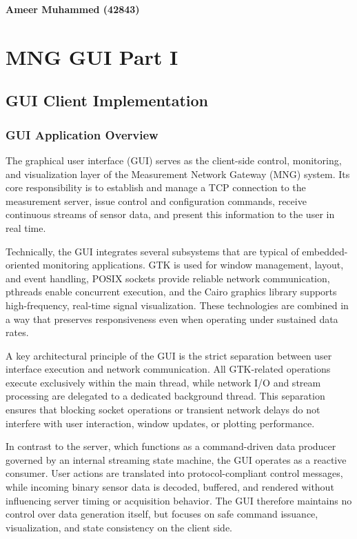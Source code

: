 

\newpage
\null 
\vfill
\begin{center}
\textbf{\large Ameer Muhammed (42843)}
\end{center}
\vfill
{}
\clearpage	

\chapter{MNG GUI Part I}
\section{GUI Client Implementation}
\subsection{GUI Application Overview}
The graphical user interface (GUI) serves as the client-side control, monitoring, and visualization layer of the Measurement Network Gateway (MNG) system. Its core responsibility is to establish and manage a TCP connection to the measurement server, issue control and configuration commands, receive continuous streams of sensor data, and present this information to the user in real time.

Technically, the GUI integrates several subsystems that are typical of embedded-oriented monitoring applications. GTK is used for window management, layout, and event handling, POSIX sockets provide reliable network communication, pthreads enable concurrent execution, and the Cairo graphics library supports high-frequency, real-time signal visualization. These technologies are combined in a way that preserves responsiveness even when operating under sustained data rates.

A key architectural principle of the GUI is the strict separation between user interface execution and network communication. All GTK-related operations execute exclusively within the main thread, while network I/O and stream processing are delegated to a dedicated background thread. This separation ensures that blocking socket operations or transient network delays do not interfere with user interaction, window updates, or plotting performance.

In contrast to the server, which functions as a command-driven data producer governed by an internal streaming state machine, the GUI operates as a reactive consumer. User actions are translated into protocol-compliant control messages, while incoming binary sensor data is decoded, buffered, and rendered without influencing server timing or acquisition behavior. The GUI therefore maintains no control over data generation itself, but focuses on safe command issuance, visualization, and state consistency on the client side.

